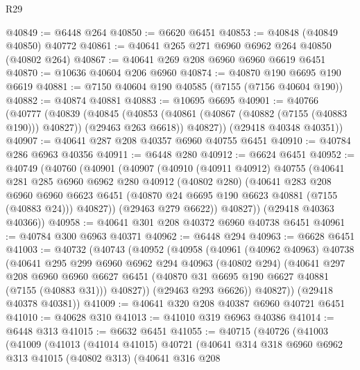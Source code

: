 \begin{lexlean}{R29}
\begin{coremodule}
@40849 := @6448 @264
@40850 := @6620 @6451
@40853 := @40848 (@40849 @40850) @40772
@40861 := @40641 @265 @271 @6960 @6962 @264 @40850 (@40802 @264)
@40867 := @40641 @269 @208 @6960 @6960 @6619 @6451
@40870 := @10636 @40604 @206 @6960
@40874 := @40870 @190 @6695 @190 @6619
@40881 := @7150 @40604 @190 @40585 (@7155 (@7156 @40604 @190))
@40882 := @40874 @40881
@40883 := @10695 @6695
@40901 := @40766
    (@40777
      (@40839
        (@40845
          (@40853 (@40861 (@40867 (@40882 (@7155 (@40883 @190))) @40827)) (@29463 @263 @6618))
          @40827))
      (@29418 @40348 @40351))
@40907 := @40641 @287 @208 @40357 @6960 @40755 @6451
@40910 := @40784 @286 @6963 @40356
@40911 := @6448 @280
@40912 := @6624 @6451
@40952 := @40749
    (@40760
      (@40901
        (@40907
          (@40910
            (@40911 @40912)
            @40755
            (@40641
              @281
              @285
              @6960
              @6962
              @280
              @40912
              (@40802 @280)
              (@40641
                @283
                @208
                @6960
                @6960
                @6623
                @6451
                (@40870 @24 @6695 @190 @6623 @40881 (@7155 (@40883 @24)))
                @40827))
            (@29463 @279 @6622))
          @40827))
      (@29418 @40363 @40366))
@40958 := @40641 @301 @208 @40372 @6960 @40738 @6451
@40961 := @40784 @300 @6963 @40371
@40962 := @6448 @294
@40963 := @6628 @6451
@41003 := @40732
    (@40743
      (@40952
        (@40958
          (@40961
            (@40962 @40963)
            @40738
            (@40641
              @295
              @299
              @6960
              @6962
              @294
              @40963
              (@40802 @294)
              (@40641
                @297
                @208
                @6960
                @6960
                @6627
                @6451
                (@40870 @31 @6695 @190 @6627 @40881 (@7155 (@40883 @31)))
                @40827))
            (@29463 @293 @6626))
          @40827))
      (@29418 @40378 @40381))
@41009 := @40641 @320 @208 @40387 @6960 @40721 @6451
@41010 := @40628 @310
@41013 := @41010 @319 @6963 @40386
@41014 := @6448 @313
@41015 := @6632 @6451
@41055 := @40715
    (@40726
      (@41003
        (@41009
          (@41013
            (@41014 @41015)
            @40721
            (@40641
              @314
              @318
              @6960
              @6962
              @313
              @41015
              (@40802 @313)
              (@40641
                @316
                @208

\end{coremodule}
\end{lexlean}
